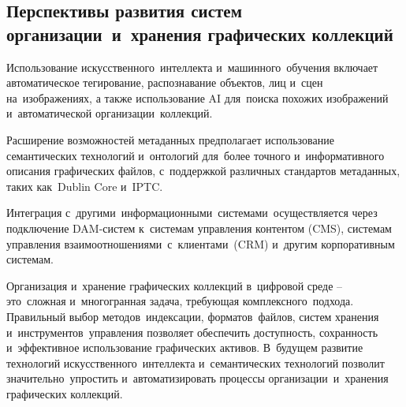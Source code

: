 \documentclass{ou}
\begin{document}
\subsection{Перспективы развития систем организации~и~хранения графических коллекций}
Использование искусственного~интеллекта и~машинного~обучения включает автоматическое тегирование, распознавание объектов, лиц и~сцен на~изображениях, а также использование AI для~поиска похожих изображений и~автоматической организации~коллекций.

Расширение возможностей метаданных предполагает использование семантических технологий и~онтологий для~более точного и~информативного описания графических файлов, с~поддержкой различных стандартов метаданных, таких как~Dublin Core и~IPTC.

Интеграция с~другими~информационными~системами~осуществляется через подключение DAM-систем к~системам управления контентом (CMS), системам управления взаимоотношениями~с~клиентами~(CRM) и~другим корпоративным системам.

Организация и~хранение графических коллекций в~цифровой среде -- это~сложная и~многогранная задача, требующая комплексного~подхода. Правильный выбор методов~индексации, форматов~файлов, систем хранения и~инструментов~управления позволяет обеспечить доступность, сохранность и~эффективное использование графических активов. В~будущем развитие технологий искусственного~интеллекта и~семантических технологий позволит значительно~упростить и~автоматизировать процессы организации~и~хранения графических коллекций.
\newpage
{
\sloppy
\nocite{*}
\cleardoublepage
{}


}
\end{document}
